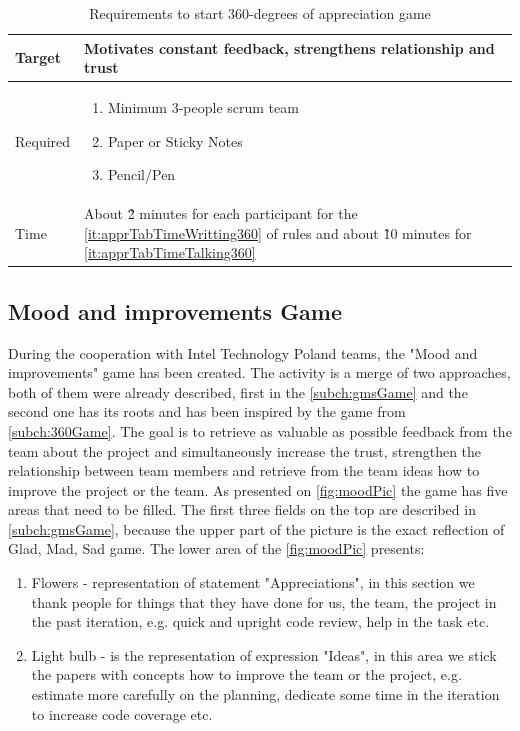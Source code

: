 \begin{table}[h]
	\caption{Requirements to start 360-degrees of appreciation game}
	\label{tab:360-req}
	\begin{tabularx}{\textwidth}{|X|X|}
	\hline
		Target & Motivates constant feedback, strengthens relationship and trust \\ \hline
		Required			& \begin{enumerate}
		    \item Minimum 3-people scrum team
		    \item Paper or Sticky Notes
		    \item Pencil/Pen
		\end{enumerate}	 \\ \hline
		Time			& About \~2 minutes for each participant for the \autoref{it:apprTabTimeWritting360} of rules and about \~10 minutes for \autoref{it:apprTabTimeTalking360}\\ \hline

	\end{tabularx}
\end{table}

\subsection{Mood and improvements Game}
\label{subch:moodGame}

During the cooperation with Intel Technology Poland teams, the "Mood and improvements" game has been created. The activity is a merge of two approaches, both of them were already described, first in the \autoref{subch:gmsGame} and the second one  has its roots and has been inspired by the game from \autoref{subch:360Game}. The goal is to retrieve as valuable as possible feedback from the team about the project and simultaneously increase the trust, strengthen the relationship between team members and retrieve from the team ideas how to improve the project or the team. 
As presented on \autoref{fig:moodPic} the game has five areas that need to be filled. The first three fields on the top are described in \autoref{subch:gmsGame}, because the upper part of the picture is the exact reflection of Glad, Mad, Sad game. The lower area of the \autoref{fig:moodPic} presents:
\begin{enumerate}
    \item Flowers - representation of statement "Appreciations", in this section we thank people for things that they have done for us, the team, the project in the past iteration, e.g. quick and upright code review, help in the task etc.
    \item Light bulb - is the representation of expression "Ideas", in this area we stick the papers with concepts how to improve the team or the project, e.g. estimate more carefully on the planning, dedicate some time in the iteration to increase code coverage etc.
\end{enumerate}


